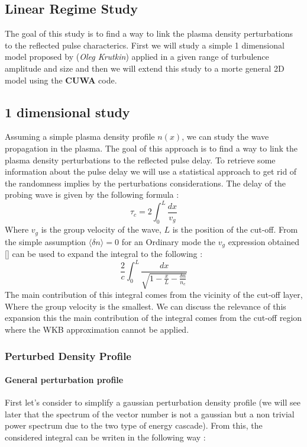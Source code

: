 \documentclass[11pt,a4paper]{report}
\begin{document}
\begin{multicols}{2}
    \chapter{Linear Regime Study}
    The goal of this study is to find a way to link the plasma density perturbations to the reflected pulse characterics. First we will study a simple 1 dimensional model proposed by (\emph{Oleg Krutkin}) applied in a given range of turbulence amplitude and size and then we will extend this study to a morte general 2D model using the \textbf{CUWA} code.
    \section{1 dimensional study}
    Assuming a simple plasma density profile $n(x)$, we can study the wave propagation in the plasma. The goal of this approach is to find a way to link the plasma density perturbations to the reflected pulse delay. To retrieve some information about the pulse delay we will
    use a statistical approach to get rid of the randomness implies by the perturbations considerations.
    The delay of the probing wave is given by the following formula  : $$\tau_c = 2 \int_0^L \frac{dx}{v_g}$$ Where $v_g$ is the group velocity of the wave, $L$ is the position of the cut-off.
    From the simple assumption $\langle \delta n \rangle = 0 $ for an Ordinary mode the  $v_g$ expression obtained [] can be used to expand the integral to the following :
    $$\frac{2}{c} \int_0^L \frac{dx}{\sqrt{1 - \frac{x}{L} - \frac{\delta n }{n_c}}}$$ The main contribution of this integral comes from the vicinity of the cut-off layer, Where the group velocity is the smallest.
    We can discuss the relevance of this expansion this the main contribution of the integral comes from the cut-off region where the WKB approximation cannot be applied.

    \subsection{Perturbed Density Profile}
    \subsubsection{General perturbation profile}
    First let's consider to simplify a gaussian perturbation density profile (we will see later that the spectrum of the vector number is not a gaussian but a non trivial power spectrum due to the two type of energy cascade). From this, the considered integral can be writen in the following way :


\end{multicols}
\end{document}
